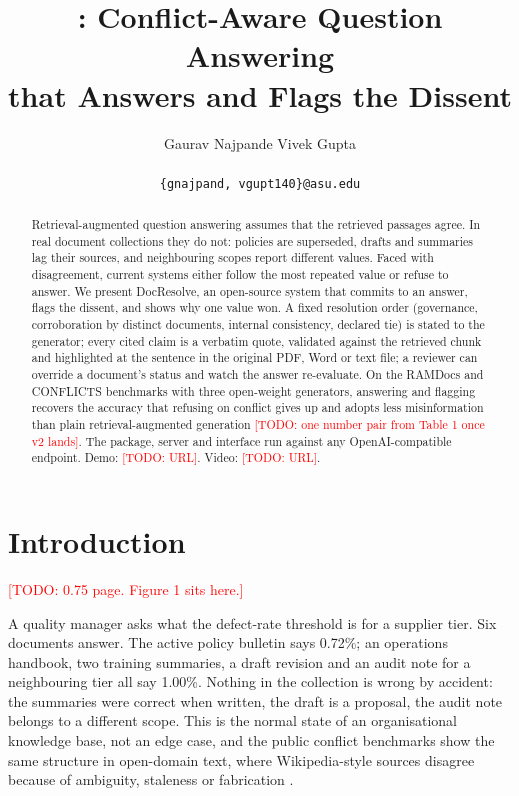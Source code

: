 \documentclass[11pt]{article}
\title{\sysname: Conflict-Aware Question Answering\\that Answers and Flags the Dissent}
\author{Gaurav Najpande \qquad Vivek Gupta \\
        \asuaffil \\
        \texttt{\{gnajpand, vgupt140\}@asu.edu}}
\newcommand{\sysname}{DocResolve}   %
\newcommand{\todo}[1]{\textcolor{red}{[TODO: #1]}}
\begin{document}
\maketitle

\begin{abstract}
Retrieval-augmented question answering assumes that the retrieved passages
agree. In real document collections they do not: policies are superseded,
drafts and summaries lag their sources, and neighbouring scopes report
different values. Faced with disagreement, current systems either follow
the most repeated value or refuse to answer. We present \sysname{}, an
open-source system that commits to an answer, flags the dissent, and shows
why one value won. A fixed resolution order (governance, corroboration by
distinct documents, internal consistency, declared tie) is stated to the
generator; every cited claim is a verbatim quote, validated against the
retrieved chunk and highlighted at the sentence in the original PDF, Word
or text file; a reviewer can override a document's status and watch the
answer re-evaluate. On the RAMDocs and CONFLICTS benchmarks with three
open-weight generators, answering and flagging recovers the accuracy that
refusing on conflict gives up and adopts less misinformation than plain
retrieval-augmented generation \todo{one number pair from Table 1 once v2
lands}. The package, server and interface run against any
OpenAI-compatible endpoint. Demo: \todo{URL}. Video: \todo{URL}.
\end{abstract}

\section{Introduction}
\todo{0.75 page. Figure 1 sits here.}

A quality manager asks what the defect-rate threshold is for a supplier
tier. Six documents answer. The active policy bulletin says 0.72\%; an
operations handbook, two training summaries, a draft revision and an audit
note for a neighbouring tier all say 1.00\%. Nothing in the collection is
wrong by accident: the summaries were correct when written, the draft is a
proposal, the audit note belongs to a different scope. This is the normal
state of an organisational knowledge base, not an edge case, and the public
conflict benchmarks show the same structure in open-domain text, where
Wikipedia-style sources disagree because of ambiguity, staleness or
fabrication \citep{wang2025ramdocs,cattan2025conflicts}.
\end{document}
